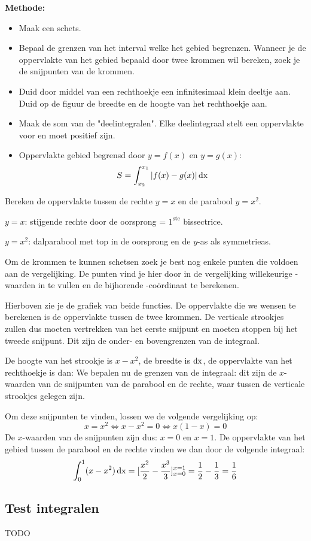 \textbf{Methode:}

\begin{itemize}
	\item Maak een schets.
	\item Bepaal de grenzen van het interval welke het gebied begrenzen. Wanneer je de oppervlakte van het gebied bepaald door twee krommen wil bereken, zoek je de snijpunten van de krommen.
	\item Duid door middel van een rechthoekje een infinitesimaal klein deeltje aan. Duid op de figuur de breedte en de hoogte van het rechthoekje aan.
	\item Maak de som van de "deelintegralen". Elke deelintegraal stelt een oppervlakte voor en moet positief zijn.
	\item Oppervlakte gebied begrensd door $y=f(x)$ en  $y=g(x)$:
	\begin{equation*}
	S=\int_{x_2}^{x_1} |f(x)-g(x)| \operatorname{dx}
	\end{equation*}
\end{itemize}


\begin{voorbeeld}
	Bereken de oppervlakte tussen de rechte $y=x$ en de parabool $y=x^2$.
	
$y=x$: stijgende rechte door de oorsprong = $1^{\text{ste}}$ bissectrice.

$y=x^2$: dalparabool met top in de oorsprong en de $y$-as als symmetrieas.

Om de krommen te kunnen schetsen zoek je best nog enkele punten die voldoen aan de vergelijking. De punten vind je hier door in de vergelijking willekeurige -waarden in te vullen en de bijhorende -coördinaat te berekenen.

Hierboven zie je de grafiek van beide functies. De oppervlakte die we wensen te berekenen is de oppervlakte tussen de twee krommen. De verticale strookjes zullen dus moeten vertrekken van het eerste snijpunt en moeten stoppen bij het tweede snijpunt. Dit zijn de onder- en bovengrenzen van de integraal.

De hoogte van het strookje is $x-x^2$, de breedte is $\operatorname{dx}$, de oppervlakte van het rechthoekje is dan: 
We bepalen nu de grenzen van de integraal: dit zijn de $x$-waarden van de snijpunten van de parabool en de rechte, waar tussen de verticale strookjes gelegen zijn.

Om deze snijpunten te vinden, lossen we de volgende vergelijking op:
\begin{equation*}
x=x^2 \iff x-x^2=0 \iff x(1-x)=0
\end{equation*}
De $x$-waarden van de snijpunten zijn dus: $x=0$ en $x=1$. 
De oppervlakte van het gebied tussen de parabool en de rechte vinden we dan door de volgende integraal:
\begin{equation*}
\int_{0}^{1} (x-x^2)\operatorname{dx} = [\frac{x^2}{2}-\frac{x^3}{3}]_{x=0}^{x=1}=\frac{1}{2}-\frac{1}{3}=\frac{1}{6}
\end{equation*}
\end{voorbeeld}


\subsection{Test integralen}
TODO